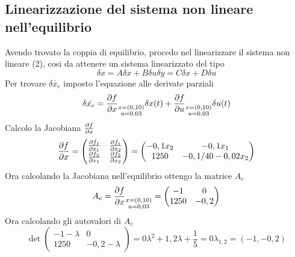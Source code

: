 \documentclass{article}
\begin{document}
\subsection{Linearizzazione del sistema non lineare nell'equilibrio }
Avendo trovato la coppia di equilibrio, procedo nel linearizzare il sistema non lineare (2), cosi da attenere un sistema linearizzato del tipo
\begin{subequations}
\begin{equation}
    \delta\dot{x}=A\delta x + B\delta u
\end{equation}
\begin{equation}
    \delta y=C\delta x + D\delta u
\end{equation}
\end{subequations}
Per trovare $\delta \dot{x_e}$ imposto l'equazione alle derivate parziali
\begin{equation}
    \delta \dot{x_e} = \diffp{f}{x}_{\substack{x=(0,10)\\ u=0,03}} \delta x(t) + \diffp{f}{u}_{\substack{x=(0,10)\\ u=0,03}} \delta u(t)
\end{equation}
Calcolo la Jacobiana $\diffp{f}{x}$
\begin{equation}
   \diffp{f}{x}=\begin{pmatrix}
   \diffp{f_1}{x_1} & \diffp{f_1}{x_2} \\
   \diffp{f_2}{x_1} & \diffp{f_2}{x_2}
   \end{pmatrix} = \begin{pmatrix}
   -0,1 x_2 & -0,1 x_1 \\
   1250 & -0,1/40-0,02 x_2
   \end{pmatrix}
\end{equation}
\newpage
Ora calcolando la Jacobiana nell'equilibrio ottengo la matrice $A_e$
\begin{equation}
    A_e = \diffp{f}{x}_{\substack{x=(0,10)\\ u=0,03}}=\begin{pmatrix}
    -1 & 0 \\
    1250 & -0,2
    \end{pmatrix}
\end{equation}
Ora calcolando gli autovalori di $A_e$
\begin{subequations}
\begin{equation}
    \det\begin{pmatrix}
    -1-\lambda & 0 \\
    1250 & -0,2-\lambda
    \end{pmatrix}=0
\end{equation}
\begin{equation}
    \lambda^2 + 1,2\lambda + \frac{1}{5}=0
\end{equation}
\begin{equation}
    \lambda_{1,2} = (-1, -0,2)
\end{equation}
\end{subequations}
\end{document}
